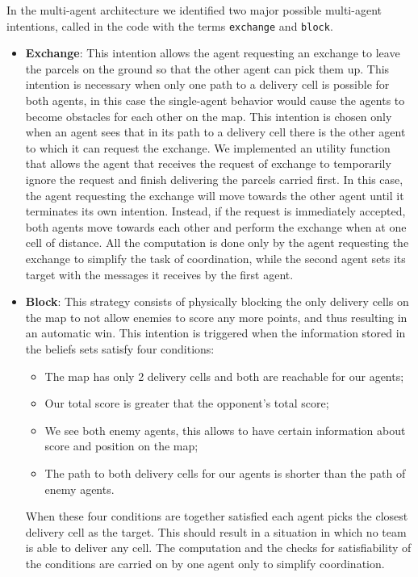 \documentclass[a4paper, 11pt]{article}
\begin{document}
In the multi-agent architecture we identified two major possible multi-agent intentions, called in the code with the terms \verb|exchange| and \verb|block|.
\begin{itemize}
\item \textbf{Exchange}: This intention allows the agent requesting an exchange to leave the parcels on the ground so that the other agent can pick them up. This intention is necessary when only one path to a delivery cell is possible for both agents, in this case the single-agent behavior would cause the agents to become obstacles for each other on the map. This intention is chosen only when an agent sees that in its path to a delivery cell there is the other agent to which it can request the exchange. We implemented an utility function that allows the agent that receives the request of exchange to temporarily ignore the request and finish delivering the parcels carried first. In this case, the agent requesting the exchange will move towards the other agent until it terminates its own intention. Instead, if the request is immediately accepted, both agents move towards each other and perform the exchange when at one cell of distance. All the computation is done only by the agent requesting the exchange to simplify the task of coordination, while the second agent sets its target with the messages it receives by the first agent.
\item \textbf{Block}: This strategy consists of physically blocking the only delivery cells on the map to not allow enemies to score any more points, and thus resulting in an automatic win. This intention is triggered when the information stored in the beliefs sets satisfy four conditions:
\begin{itemize}
\item The map has only 2 delivery cells and both are reachable for our agents;
\item Our total score is greater that the opponent's total score;
\item We see both enemy agents, this allows to have certain information about score and position on the map;
\item The path to both delivery cells for our agents is shorter than the path of enemy agents.
\end{itemize}
When these four conditions are together satisfied each agent picks the closest delivery cell as the target. This should result in a situation in which no team is able to deliver any cell. The computation and the checks for satisfiability of the conditions are carried on by one agent only to simplify coordination.
\end{itemize}
\end{document}
